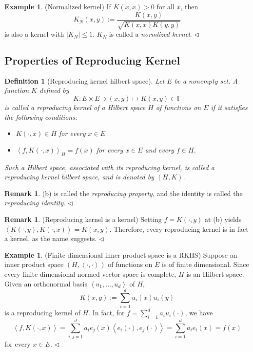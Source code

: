 \documentclass[a4paper,12pt]{article}
\newtheorem{dfn}[thm]{Definition}
\theoremstyle{remark}
\theoremstyle{definition}
\newtheorem{rem}[thm]{Remark}
\theoremstyle{definition}
\newtheorem{ex}[thm]{Example}
\theoremstyle{definition}
\newcommand{\ip}[2]{\left<#1, #2 \right>}
\newcommand{\abs}[1]{\left| #1 \right|}
\newcommand{\fin}{\hfill \( \triangleleft \) }
\begin{document}
\begin{ex} (Normalized kernel)
	If \( K(x,x) >0 \) for all \( x \), then
	\[
		K_N(x,y) := \frac{K(x,y)}{\sqrt{K(x,x)K(y,y)}}
	\]
	is also a kernel with \( \abs{K_N} \le 1 \). \( K_N \) is called a \textit{normlized kernel}.
	\fin\end{ex}

\subsection{Properties of Reproducing Kernel}
\begin{dfn}[Reproducing kernel hilbert space]
	Let \( E \) be a nonempty set. A function \( K \) defined by
	\[
		K:E \times E \ni (x,y) \mapsto K(x,y) \in \mathbb{F}
	\]
	is called a reproducing kernel of a Hilbert space \( H \) of functions on \( E \) if it satisfies the following conditions:
	\begin{itemize}
		\item[(a)] \( K(\cdot, x) \in H \) for every \( x \in E \)
		\item[(b)]  \( \ip{f}{K(\cdot, x)}_H = f(x) \) for every \( x \in E \) and every \( f \in H \).
	\end{itemize}
	Such a Hilbert space, associated with its reproducing kernel, is called a reproducing kernel hilbert space, and is denoted by \( (H,K) \).
\end{dfn}

\begin{rem}
	(b) is called the \textit{reproducing property}, and the identity is called the \textit{reproducing identity}.
	\fin\end{rem}

\begin{rem} (Reproducing kernel is a kernel)
	Setting \( f = K(\cdot ,y) \) at (b) yields \( \ip{K(\cdot ,y)}{K(\cdot ,x)} = K(x,y)\). Therefore, every reproducing kernel is in fact a kernel, as the name suggests.
	\fin\end{rem}

\begin{ex} (Finite dimensional inner product space is a RKHS)
	Suppose an inner product space \( (H, \ip{\cdot }{\cdot }) \) of functions on \( E \) is of finite dimensional. Since every finite dimensional normed vector space is complete, \( H \) is an Hilbert space. Given an orthonormal basis \( \left< u_1, \ldots, u_d \right> \) of \( H \),
	\[
		K(x,y) := \sum_{i=1}^{d} u_i(x)u_i(y)
	\]
	is a reproducing kernel of \( H \). In fact, for \( f = \sum_{i=1}^{d} a_i u_i(\cdot )  \), we have
	\[
		\ip{f}{K(\cdot ,x)}
		= \sum_{i,j=1}^{d} a_ie_j(x) \ip{e_i(\cdot )}{e_j(\cdot )}
		= \sum_{i=1}^{d} a_ie_i(x)
		= f(x)
	\]
	for every \( x \in E \).
	\fin\end{ex}
\end{document}
